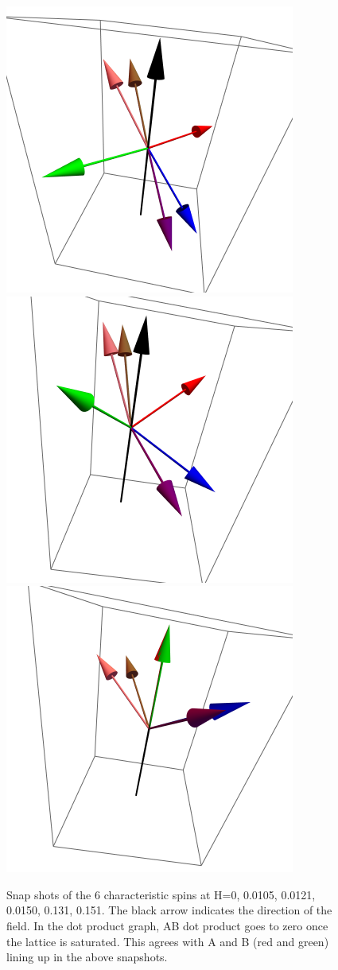 \begin{figure}[ht]
\includegraphics[scale=0.3]{25june16/HVariedData/Pictures/001Inc151.png}
\includegraphics[scale=0.3]{25june16/HVariedData/Pictures/001Inc30S.png}
\includegraphics[scale=0.3]{25june16/HVariedData/Pictures/001Inc35S.png}
\caption{Snap shots of the 6 characteristic spins at H=0, 0.0105, 0.0121, 0.0150, 0.131, 0.151. The black arrow
indicates the direction of the field. In the dot product graph, AB dot product goes to zero once the lattice 
is saturated. This agrees with A and B (red and green) lining up in the above snapshots.}
\end{figure}
\clearpage

